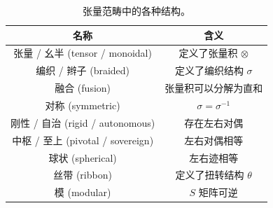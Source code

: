 \begin{table}[htb]
  \centering
  \renewcommand{\arraystretch}{1}
  \begin{tabular}{cc}
    \toprule
      名称 & 含义 \\
    \midrule
      张量 / 幺半 (tensor / monoidal)   & 定义了张量积 $\otimes$  \\
      编织 / 辫子 (braided)             & 定义了编织结构 $\sigma$ \\
      融合        (fusion)              & 张量积可以分解为直和    \\
      对称        (symmetric)           & $\sigma=\sigma^{-1}$    \\
      刚性 / 自治 (rigid / autonomous)  & 存在左右对偶            \\
      中枢 / 至上 (pivotal / sovereign) & 左右对偶相等            \\
      球状        (spherical)           & 左右迹相等              \\
      丝带        (ribbon)              & 定义了扭转结构 $\theta$ \\
      模          (modular)             & $S$ 矩阵可逆            \\
    \bottomrule
  \end{tabular}
  \caption[张量范畴中的各种结构]{张量范畴中的各种结构。}
  \label{tab:tensor-category-ingredients}
\end{table}

